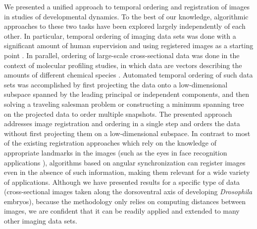 \documentclass{pnastwo}
\begin{document}
\begin{article}
We presented a unified approach to temporal ordering and registration of images in studies of developmental dynamics. 
%
To the best of our knowledge, algorithmic approaches to these two tasks have been explored largely independently of each other. 
%
In particular, temporal ordering of imaging data sets was done with a significant amount of human supervision and using registered images as a starting point \cite{yuan2014automated, surkova2008characterization}.  
%
In parallel, ordering of large-scale cross-sectional data was done in the context of molecular profiling studies, in which data are vectors describing the amounts of different chemical species \cite{anavy2014blind, trapnell2014dynamics, gupta2008extracting}. 
%
Automated temporal ordering of such data sets was accomplished by first projecting the data onto a low-dimensional subspace spanned by the leading principal or independent components, and then solving a traveling salesman problem or constructing a minimum spanning tree on the projected data to order multiple snapshots. 
%
The presented approach addresses image registration and ordering in a single step and orders the data without first projecting them on a low-dimensional subspace.
%
%
In contrast to most of the existing registration approaches which rely on the knowledge of appropriate landmarks in the images \cite{ian1998statistical} (such as the eyes in face recognition applications \cite{zhao2003face}), algorithms based on angular synchronization can register images even in the absence of such information, making them relevant for a wide variety of applications. 
%
Although we have presented results for a specific type of data (cross-sectional images taken along the dorsoventral axis of developing {\em Drosophila} embryos), because the methodology only relies on computing distances between images, we are confident that it can be readily applied and extended to many other imaging data sets. 


\end{article}
\end{document}
